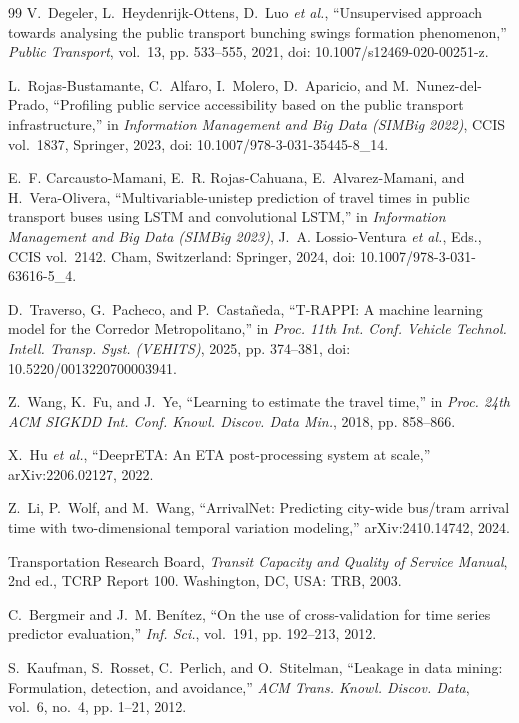 \documentclass[conference,spanish]{IEEEtran}
\begin{document}
\begin{thebibliography}{99}
V.~Degeler, L.~Heydenrijk-Ottens, D.~Luo \textit{et al.},
``Unsupervised approach towards analysing the public transport bunching swings formation phenomenon,''
\textit{Public Transport}, vol.~13, pp. 533--555, 2021,
doi: 10.1007/s12469-020-00251-z.

L.~Rojas-Bustamante, C.~Alfaro, I.~Molero, D.~Aparicio, and M.~Nunez-del-Prado,
``Profiling public service accessibility based on the public transport infrastructure,''
in \textit{Information Management and Big Data (SIMBig 2022)}, CCIS vol.~1837, Springer, 2023,
doi: 10.1007/978-3-031-35445-8\_14.

E.~F. Carcausto-Mamani, E.~R. Rojas-Cahuana, E.~Alvarez-Mamani, and H.~Vera-Olivera,
``Multivariable-unistep prediction of travel times in public transport buses using LSTM and convolutional LSTM,''
in \textit{Information Management and Big Data (SIMBig 2023)}, J.~A. Lossio-Ventura \textit{et al.}, Eds., CCIS vol.~2142.
Cham, Switzerland: Springer, 2024,
doi: 10.1007/978-3-031-63616-5\_4.

D.~Traverso, G.~Pacheco, and P.~Casta{\~n}eda,
``T-RAPPI: A machine learning model for the Corredor Metropolitano,''
in \textit{Proc. 11th Int. Conf. Vehicle Technol. Intell. Transp. Syst. (VEHITS)}, 2025, pp. 374--381,
doi: 10.5220/0013220700003941.

Z.~Wang, K.~Fu, and J.~Ye,
``Learning to estimate the travel time,''
in \textit{Proc. 24th ACM SIGKDD Int. Conf. Knowl. Discov. Data Min.}, 2018, pp. 858--866.

X.~Hu \textit{et al.},
``DeeprETA: An ETA post-processing system at scale,''
arXiv:2206.02127, 2022.

Z.~Li, P.~Wolf, and M.~Wang,
``ArrivalNet: Predicting city-wide bus/tram arrival time with two-dimensional temporal variation modeling,''
arXiv:2410.14742, 2024.

Transportation Research Board,
\textit{Transit Capacity and Quality of Service Manual}, 2nd ed., TCRP Report 100.
Washington, DC, USA: TRB, 2003.

C.~Bergmeir and J.~M. Ben{\'i}tez,
``On the use of cross-validation for time series predictor evaluation,''
\textit{Inf. Sci.}, vol.~191, pp. 192--213, 2012.

S.~Kaufman, S.~Rosset, C.~Perlich, and O.~Stitelman,
``Leakage in data mining: Formulation, detection, and avoidance,''
\textit{ACM Trans. Knowl. Discov. Data}, vol.~6, no.~4, pp. 1--21, 2012.


\end{thebibliography}
\end{document}
